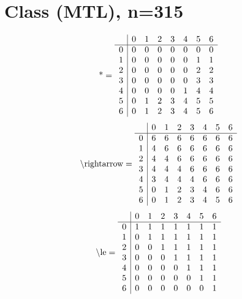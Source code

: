 \documentclass[11pt]{article}
\begin{document}
\section{Class (MTL), n=315}
\[\text{*} = 
\begin{array}{r | r r r r r r r}
 & 0 & 1 & 2 & 3 & 4 & 5 & 6 \\ \hline
0 & 0 & 0 & 0 & 0 & 0 & 0 & 0 \\
1 & 0 & 0 & 0 & 0 & 0 & 1 & 1 \\
2 & 0 & 0 & 0 & 0 & 0 & 2 & 2 \\
3 & 0 & 0 & 0 & 0 & 0 & 3 & 3 \\
4 & 0 & 0 & 0 & 0 & 1 & 4 & 4 \\
5 & 0 & 1 & 2 & 3 & 4 & 5 & 5 \\
6 & 0 & 1 & 2 & 3 & 4 & 5 & 6 \\
\end{array}
\]
\[\text{\textbackslash rightarrow} = 
\begin{array}{r | r r r r r r r}
 & 0 & 1 & 2 & 3 & 4 & 5 & 6 \\ \hline
0 & 6 & 6 & 6 & 6 & 6 & 6 & 6 \\
1 & 4 & 6 & 6 & 6 & 6 & 6 & 6 \\
2 & 4 & 4 & 6 & 6 & 6 & 6 & 6 \\
3 & 4 & 4 & 4 & 6 & 6 & 6 & 6 \\
4 & 3 & 4 & 4 & 4 & 6 & 6 & 6 \\
5 & 0 & 1 & 2 & 3 & 4 & 6 & 6 \\
6 & 0 & 1 & 2 & 3 & 4 & 5 & 6 \\
\end{array}
\]
\[\text{\textbackslash le} = 
\begin{array}{r | r r r r r r r}
 & 0 & 1 & 2 & 3 & 4 & 5 & 6 \\ \hline
0 & 1 & 1 & 1 & 1 & 1 & 1 & 1 \\
1 & 0 & 1 & 1 & 1 & 1 & 1 & 1 \\
2 & 0 & 0 & 1 & 1 & 1 & 1 & 1 \\
3 & 0 & 0 & 0 & 1 & 1 & 1 & 1 \\
4 & 0 & 0 & 0 & 0 & 1 & 1 & 1 \\
5 & 0 & 0 & 0 & 0 & 0 & 1 & 1 \\
6 & 0 & 0 & 0 & 0 & 0 & 0 & 1 \\
\end{array}
\]
\end{document}
